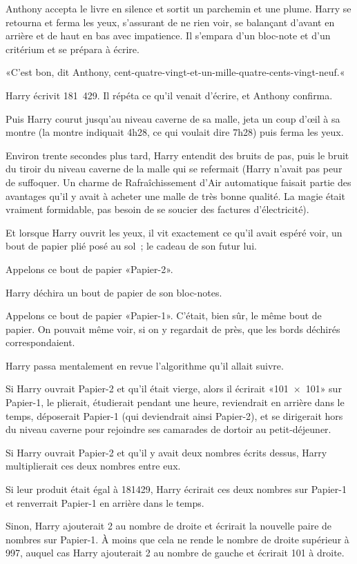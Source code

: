 Anthony accepta le livre en silence et sortit un parchemin et une plume. Harry se retourna et ferma les yeux, s'assurant de ne rien voir, se balançant d'avant en arrière et de haut en bas avec impatience. Il s'empara d'un bloc-note et d'un critérium et se prépara à écrire.

«C'est bon, dit Anthony, cent-quatre-vingt-et-un-mille-quatre-cents-vingt-neuf.«

Harry écrivit 181~429. Il répéta ce qu'il venait d'écrire, et Anthony confirma.

Puis Harry courut jusqu'au niveau caverne de sa malle, jeta un coup d'œil à sa montre (la montre indiquait 4h28, ce qui voulait dire 7h28) puis ferma les yeux.

Environ trente secondes plus tard, Harry entendit des bruits de pas, puis le bruit du tiroir du niveau caverne de la malle qui se refermait (Harry n'avait pas peur de suffoquer. Un charme de Rafraîchissement d'Air automatique faisait partie des avantages qu'il y avait à acheter une malle de très bonne qualité. La magie était vraiment formidable, pas besoin de se soucier des factures d'électricité).

Et lorsque Harry ouvrit les yeux, il vit exactement ce qu'il avait espéré voir, un bout de papier plié posé au sol~; le cadeau de son futur lui.

Appelons ce bout de papier «Papier-2».

Harry déchira un bout de papier de son bloc-notes.

Appelons ce bout de papier «Papier-1». C'était, bien sûr, le même bout de papier. On pouvait même voir, si on y regardait de près, que les bords déchirés correspondaient.

Harry passa mentalement en revue l'algorithme qu'il allait suivre.

Si Harry ouvrait Papier-2 et qu'il était vierge, alors il écrirait «101~$\times$~101» sur Papier-1, le plierait, étudierait pendant une heure, reviendrait en arrière dans le temps, déposerait Papier-1 (qui deviendrait ainsi Papier-2), et se dirigerait hors du niveau caverne pour rejoindre ses camarades de dortoir au petit-déjeuner.

Si Harry ouvrait Papier-2 et qu'il y avait deux nombres écrits dessus, Harry multiplierait ces deux nombres entre eux.

Si leur produit était égal à 181429, Harry écrirait ces deux nombres sur Papier-1 et renverrait Papier-1 en arrière dans le temps.

Sinon, Harry ajouterait 2 au nombre de droite et écrirait la nouvelle paire de nombres sur Papier-1. À moins que cela ne rende le nombre de droite supérieur à 997, auquel cas Harry ajouterait 2 au nombre de gauche et écrirait 101 à droite.

